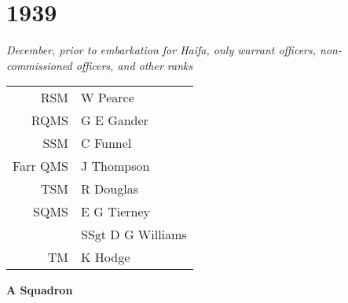 \chapter*{1939}

\begin{center}
  \textit{December, prior to embarkation for Haifa, only warrant officers, non-commissioned officers, and other ranks}
\end{center}

\begin{center}
  \begin{tabular}{rl}
    RSM & W Pearce \\
    RQMS & G E Gander \\
    SSM & C Funnel \\
    Farr QMS & J Thompson \\
    TSM & R Douglas \\
    SQMS & E G Tierney \\
    & SSgt D G Williams \\
    TM & K Hodge \\
  \end{tabular}
\end{center}

\begin{center}
  \Large
  \textbf{A Squadron}
\end{center}

